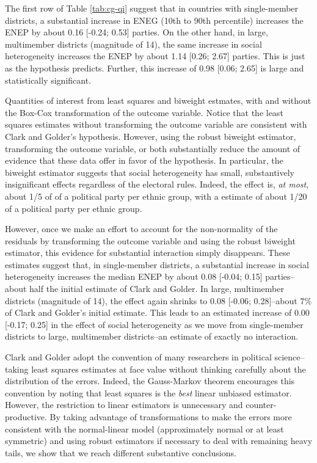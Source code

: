 \documentclass[12pt]{article}
\begin{document}
The first row of Table \ref{tab:cg-qi} suggest that in countries with single-member districts, a substantial increase in ENEG (10th to 90th percentile) increases the ENEP by about 0.16 [-0.24; 0.53] parties. On the other hand, in large, multimember districts (magnitude of 14), the same increase in social heterogeneity increases the ENEP by about 1.14 [0.26; 2.67] parties. This is just as the hypothesis predicts. Further, this increase of 0.98 [0.06; 2.65] is large and statistically significant.

\begin{table}[h!]
{\scriptsize

}
\caption{Quantities of interest from least squares and biweight estmates, with and without the Box-Cox transformation of the outcome variable. Notice that the least squares estimates without transforming the outcome variable are consistent with Clark and Golder's hypothesis. However, using the robust biweight estimator,  transforming the outcome variable, or both substantially reduce the amount of evidence that these data offer in favor of the hypothesis. In particular, the biweight estimator suggests that social heterogeneity has small, substantively insignificant effects regardless of the electoral rules. Indeed, the effect is, \textit{at most}, about 1/5 of of a political party per ethnic group, with a estimate of about 1/20 of a political party per ethnic group. }\label{tab:cg-qi}
\end{table}

However, once we make an effort to account for the non-normality of the residuals by transforming the outcome variable and using the robust biweight estimator, this evidence for substantial interaction simply disappears. These estimates suggest that, in single-member districts, a substantial increase in social heterogeneity increases the median ENEP by about 0.08 [-0.04; 0.15] parties--about half the initial estimate of Clark and Golder. In large, multimember districts (magnitude of 14), the effect again shrinks to 0.08 [-0.06; 0.28]--about 7\% of Clark and Golder's initial estimate. This leads to an estimated increase of 0.00 [-0.17; 0.25] in the effect of social heterogeneity as we move from single-member districts to large, multimember districts--an estimate of exactly no interaction.

Clark and Golder adopt the convention of many researchers in political science--taking least squares estimates at face value without thinking carefully about the distribution of the errors. Indeed, the Gauss-Markov theorem encourages this convention by noting that least squares is the \textit{best} linear unbiased estimator. However, the restriction to linear estimators is unnecessary and counter-productive. By taking advantage of transformations to make the errors more consistent with the normal-linear model (approximately normal or at least symmetric) and using robust estimators if necessary to deal with remaining heavy tails, we show that we reach different substantive conclusions. 
\end{document}
